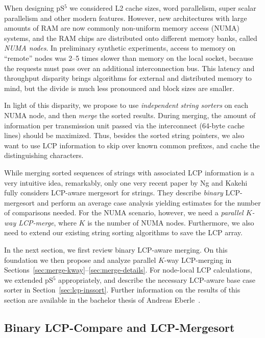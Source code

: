 \documentclass[a4paper]{myjournal}
\begin{document}
When designing pS$^5$ we considered L2 cache sizes, word parallelism, super
scalar parallelism and other modern features. However, new architectures with
large amounts of RAM are now commonly non-uniform memory access (NUMA) systems,
and the RAM chips are distributed onto different memory banks, called \emph{NUMA
  nodes}. In preliminary synthetic experiments, access to memory on ``remote''
nodes was 2--5 times slower than memory on the local socket, because the
requests must pass over an additional interconnection bus. This latency and
throughput disparity brings algorithms for external and distributed memory to
mind, but the divide is much less pronounced and block sizes are smaller.

In light of this disparity, we propose to use \emph{independent string sorters}
on each NUMA node, and then \emph{merge} the sorted results. During merging, the
amount of information per transmission unit passed via the interconnect (64-byte
cache lines) should be maximized. Thus, besides the sorted string pointers, we
also want to use LCP information to skip over known common prefixes, and cache
the distinguishing characters.

While merging sorted sequences of strings with associated LCP information is a
very intuitive idea, remarkably, only one very recent paper by Ng and
Kakehi~\cite{ng2008merging} fully considers LCP-aware mergesort for
strings. They describe \emph{binary} LCP-merge\-sort and perform an average case
analysis yielding estimates for the number of comparisons needed. For the NUMA
scenario, however, we need a \emph{parallel $K$-way LCP-merge}, where $K$ is
the number of NUMA nodes.  Furthermore, we also need to extend our existing
string sorting algorithms to save the LCP array.

In the next section, we first review binary LCP-aware merging. On this
foundation we then propose and analyze parallel $K$-way LCP-merging in
Sections~\ref{sec:merge-kway}--\ref{sec:merge-details}. For node-local LCP
calculations, we extended pS$^5$ appropriately, and describe the necessary
LCP-aware base case sorter in Section~\ref{sec:lcp-inssort}. Further information
on the results of this section are available in the bachelor thesis of Andreas
Eberle~\cite{eberle2014parallel}.

\subsection{Binary LCP-Compare and LCP-Mergesort}\label{sec:mergesort-binary}
\end{document}
